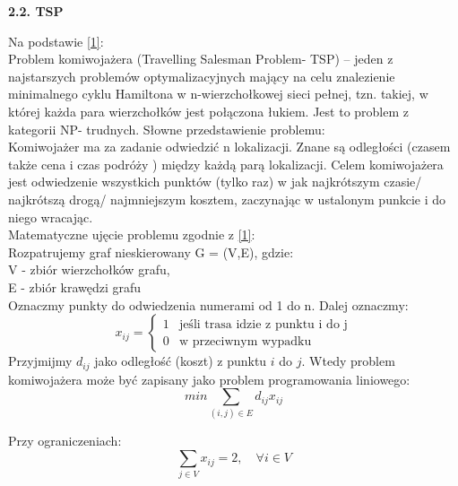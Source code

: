 \documentclass[a4paper, twoside, 12pt, justified]{article}
\begin{document}
	\begin{flushleft}
		\begin{large}
			\textbf{2.2. TSP}
		\end{large}
	\end{flushleft}
	\vspace{5mm} %

	
	Na podstawie \hyperlink{komiwojazer}{[1]}:\\
	Problem komiwojażera (Travelling Salesman Problem- TSP) – jeden z najstarszych problemów optymalizacyjnych mający na celu znalezienie minimalnego cyklu Hamiltona w n-wierzchołkowej sieci pełnej, tzn. takiej, w której każda para wierzchołków jest połączona łukiem. Jest to problem z kategorii NP- trudnych. Słowne przedstawienie problemu:\\ 
	Komiwojażer ma za zadanie odwiedzić n lokalizacji. Znane są odległości (czasem także cena i czas podróży ) między każdą parą lokalizacji.
	Celem komiwojażera jest odwiedzenie wszystkich punktów (tylko raz) w jak najkrótszym czasie/ najkrótszą drogą/ najmniejszym kosztem, zaczynając w ustalonym punkcie i do niego wracając.\\
	Matematyczne ujęcie problemu zgodnie z \hyperlink{tsp_math_model}{[1]}:\\
	Rozpatrujemy graf nieskierowany G = (V,E), gdzie: \\
	V - zbiór wierzchołków grafu,\\
	E - zbiór krawędzi grafu\\
	Oznaczmy punkty do odwiedzenia numerami od 1 do n. Dalej oznaczmy:
	\[ x_{ij} = 
	\begin{cases}
	1 &\mbox{jeśli trasa idzie z punktu i do j} \\
	0 &\mbox{w przeciwnym wypadku}
	\end{cases}
	\]
	Przyjmijmy $d_{ij}$ jako odległość (koszt) z punktu $i$ do $j$. Wtedy problem komiwojażera może być zapisany jako problem programowania liniowego:\\
	  
	  \begin{equation}
		  {min \sum\limits_{(i,j) \in E} d_{ij}x_{ij}}
	  \end{equation}
	  
	  Przy ograniczeniach:\\
	  
	  \begin{equation}
	  	  {\sum\limits_{j \in V} x_{ij} = 2}, \quad \forall i \in V
	  \end{equation}
	  
\end{document}
